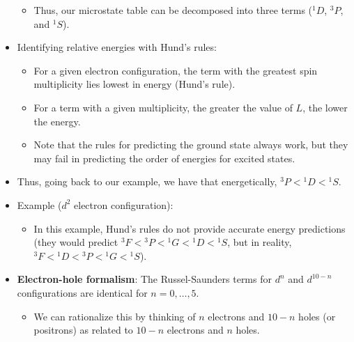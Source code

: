\documentclass[../notes.tex]{subfiles}
\begin{document}
\begin{itemize}
\begin{itemize}
\begin{itemize}
        \end{itemize}
        \item Thus, our microstate table can be decomposed into three terms (${}^1D$, ${}^3P$, and ${}^1S$).
    \end{itemize}
    \item Identifying relative energies with Hund's rules:
    \begin{itemize}
        \item For a given electron configuration, the term with the greatest spin multiplicity lies lowest in energy (Hund's rule).
        \item For a term with a given multiplicity, the greater the value of $L$, the lower the energy.
        \item Note that the rules for predicting the ground state always work, but they may fail in predicting the order of energies for excited states.
    \end{itemize}
    \item Thus, going back to our example, we have that energetically, ${}^3P<{}^1D<{}^1S$.
    \item Example ($d^2$ electron configuration):
    \begin{itemize}
        \item In this example, Hund's rules do not provide accurate energy predictions (they would predict ${}^3F<{}^3P<{}^1G<{}^1D<{}^1S$, but in reality, ${}^3F<{}^1D<{}^3P<{}^1G<{}^1S$).
    \end{itemize}
    \item \textbf{Electron-hole formalism}: The Russel-Saunders terms for $d^n$ and $d^{10-n}$ configurations are identical for $n=0,\dots,5$.
    \begin{itemize}
        \item We can rationalize this by thinking of $n$ electrons and $10-n$ holes (or positrons) as related to $10-n$ electrons and $n$ holes.
    \end{itemize}
\end{itemize}
\end{document}
